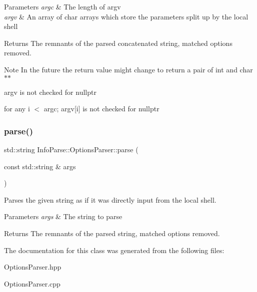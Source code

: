 \begin{DoxyParams}{Parameters}
{\em argc}
    & The length of argv \\
    \hline
    {\em argv} & An array of char arrays which store the parameters split up by the local shell \\
    \hline
\end{DoxyParams}
\begin{DoxyReturn}{Returns}
    The remnants of the parsed concatenated string, matched options removed.
\end{DoxyReturn}
\begin{DoxyNote}{Note}
In the future the return value might change to return a pair of int and char$\ast$$\ast$

argv is not checked for {\ttfamily nullptr}

for any i $<$ argc; argv\mbox{[}i\mbox{]} is not checked for {\ttfamily nullptr}
\end{DoxyNote}
\mbox{\label{class_info_parse_1_1_options_parser_a78fa47e8a288b70ebbe3a9597c846a49}}
\subsubsection{\texorpdfstring{parse()}{parse()}\hspace{0.1cm}{\footnotesize\ttfamily [2/2]}}
{\footnotesize\ttfamily std\+::string Info\+Parse\+::\+Options\+Parser\+::parse (\begin{DoxyParamCaption}\item[{const std\+::string \&}]{args }\end{DoxyParamCaption})}



Parses the given string as if it was directly input from the local shell.


\begin{DoxyParams}{Parameters}
{\em args} & The string to parse \\
\hline
\end{DoxyParams}
\begin{DoxyReturn}{Returns}
The remnants of the parsed string, matched options removed.
\end{DoxyReturn}


The documentation for this class was generated from the following files\+:\begin{DoxyCompactItemize}
\item
Options\+Parser.\+hpp\item
Options\+Parser.\+cpp\end{DoxyCompactItemize}

